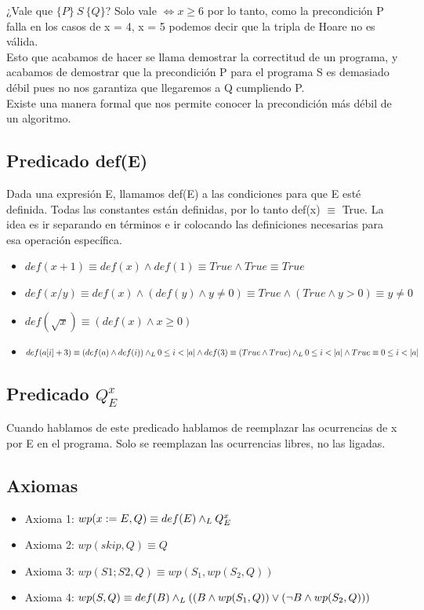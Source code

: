 \documentclass[10pt,a4paper]{article}
\begin{document}
¿Vale que \(\{P\} \ S \ \{Q\}\)?
Solo vale \(\iff x \ge 6\) por lo tanto, como la precondición P falla en los casos de x = 4, x = 5 podemos decir que la tripla de Hoare no es válida.\\

Esto que acabamos de hacer se llama demostrar la correctitud de un programa, y acabamos de demostrar que la precondición P para el programa S es demasiado débil pues no nos garantiza que llegaremos a Q cumpliendo P. \\

Existe una manera formal que nos permite conocer la precondición más débil de un algoritmo.
\newpage
\subsection*{Predicado def(E)}
Dada una expresión E, llamamos def(E) a las condiciones para que E esté definida. Todas las constantes están definidas, por lo tanto def(x) \(\equiv\) True. La idea es ir separando en términos e ir colocando las definiciones necesarias para esa operación específica.
\begin{itemize}
    \item \(def(x+1) \equiv def(x) \land def(1) \equiv True \land True \equiv True\)
    \item \(def(x/y) \equiv def(x) \land (def(y) \land y\neq0) \equiv True \land (True \land y>0) \equiv y\neq0\)
    \item \(def(\sqrt{x}) \equiv (def(x) \land x\ge0)\)
    \item \(def(a[i]+3) \equiv (def(a) \land def(i)) \yLuego 0 \le i<\longitud{a} \land def(3) \equiv (True \land True) \yLuego 0\le i<\longitud{a} \land True \equiv 0\le i<\longitud{a}\)
\end{itemize}

\subsection*{Predicado \(Q^{x}_{E}\)}
Cuando hablamos de este predicado hablamos de reemplazar las ocurrencias de x por E en el programa. Solo se reemplazan las ocurrencias libres, no las ligadas.
\subsection*{Axiomas}
\begin{itemize}
    \item Axioma 1: \(wp(x := E, Q) \equiv def(E) \land _L Q^{x}_{E}\)
    \item Axioma 2: \(wp(skip, Q) \equiv Q\)
    \item Axioma 3: \(wp(S1; S2, Q) \equiv wp(S_{1}, wp(S_{2}, Q))\)
    \item Axioma 4: \(wp(S, Q) \equiv def(B) \land _L ((B \land wp(S_{1}, Q)) \lor (\neg B \land wp(S_{2}, Q)))\)
\end{itemize} 
\end{document}
